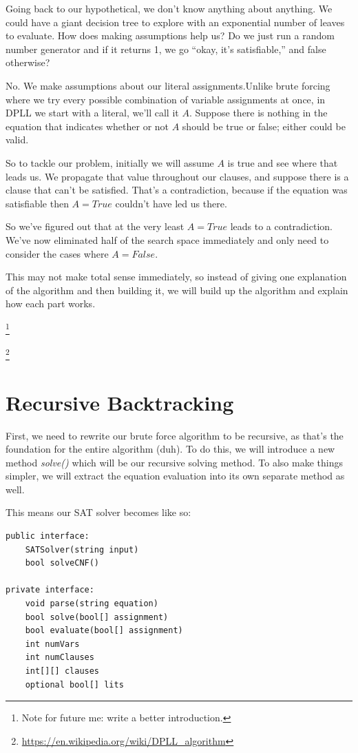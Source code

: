 \documentclass[oneside]{book}
\begin{document}
Going back to our hypothetical, we don't know anything about anything. We
could have a giant decision tree to explore with an exponential number of leaves
to evaluate. How does making assumptions help us? Do we just run a random number generator 
and if it returns 1, we go ``okay, it's satisfiable,'' and false otherwise?

No. We make assumptions about our literal assignments.Unlike brute forcing where we try 
every possible combination of variable assignments at once, in DPLL we start with a literal, 
we'll call it $A$. Suppose there is nothing in the equation that indicates whether or not 
$A$ should be true or false; either could be valid.

So to tackle our problem, initially we will assume $A$ is true and see where
that leads us. We propagate that value throughout our clauses, and suppose
there is a clause that can't be satisfied. That's a contradiction, because if the
equation was satisfiable then $A = True$ couldn't have led us there.

So we've figured out that at the very least $A = True$ leads to a
contradiction. We've now eliminated half of the search space immediately and only need to
consider the cases where $A = False$.

This may not make total sense immediately, so instead of giving one explanation
of the algorithm and then building it, we will build up the algorithm and explain
how each part works.

\footnote{Note for future me: write a better introduction.}

\footnote{\url{https://en.wikipedia.org/wiki/DPLL_algorithm}}

\section{Recursive Backtracking}

First, we need to rewrite our brute force algorithm to be recursive, as that's
the foundation for the entire algorithm (duh). To do this, we will introduce a
new method \textit{solve()} which will be our recursive solving method. To
also make things simpler, we will extract the equation evaluation into its own
separate method as well.

This means our SAT solver becomes like so:

\begin{lstlisting}
public interface:
    SATSolver(string input)
    bool solveCNF()

private interface:
    void parse(string equation)
    bool solve(bool[] assignment)
    bool evaluate(bool[] assignment)
    int numVars
    int numClauses
    int[][] clauses
    optional bool[] lits
\end{lstlisting}
\end{document}
